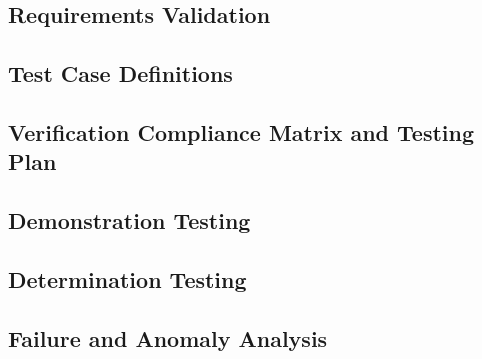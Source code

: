 \documentclass[../main.tex]{subfiles}
\begin{document}
\subsection{Requirements Validation}

\subsection{Test Case Definitions}

\subsection{Verification Compliance Matrix and Testing Plan}

\subsection{Demonstration Testing}

\subsection{Determination Testing}

\subsection{Failure and Anomaly Analysis}
\end{document}

